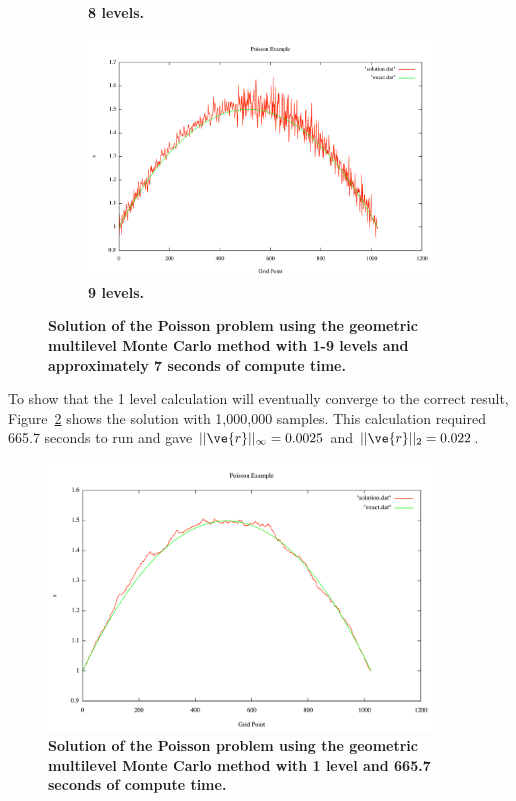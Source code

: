 \documentclass[note]{TechNote}
\begin{document}
\begin{figure}[h!]
\begin{subfigure}[b]{0.3\textwidth}
    \caption{\textbf{8 levels.}}
  \end{subfigure}
  \begin{subfigure}[b]{0.3\textwidth}
    \includegraphics[width=\textwidth]{7_sec_9_level.pdf}
    \caption{\textbf{9 levels.}}
  \end{subfigure}
  \caption{\textbf{Solution of the Poisson problem using the geometric
      multilevel Monte Carlo method with 1-9 levels and approximately
      7 seconds of compute time.}}
  \label{fig:heterogenous_ml_solutions}
\end{figure}

To show that the 1 level calculation will eventually converge to the
correct result, Figure~\ref{fig:converged_1_level} shows the solution
with 1,000,000 samples. This calculation required 665.7 seconds to run
and gave $||\ve{r}||_\infty = 0.0025$ and $||\ve{r}||_2 = 0.022$.
\begin{figure}[h!]
  \begin{center}
    \includegraphics[width=4in]{converged_1_level.pdf}
  \end{center}
  \caption{\textbf{Solution of the Poisson problem using the geometric
      multilevel Monte Carlo method with 1 level and 665.7 seconds of
      compute time.}}
  \label{fig:converged_1_level}
\end{figure}
\end{document}

